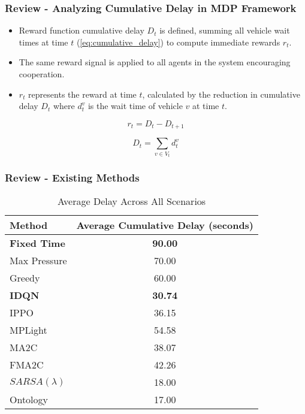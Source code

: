 \documentclass[compress,12pt]{beamer}
\begin{document}
\begin{frame}[bg=arguelles.png]
      \frametitle{Review - Analyzing Cumulative Delay in MDP Framework}
      \begin{itemize}
        \item Reward function cumulative delay $D_t$ is defined, summing all vehicle wait times at time $t$ (\ref{eq:cumulative_delay}) to compute immediate rewards $r_t$.
        \item The same reward signal is applied to all agents in the system encouraging cooperation.
        \item $r_t$ represents the reward at time $t$, calculated by the reduction in cumulative delay $D_t$ where $d_t^v$ is the wait time of vehicle $v$ at time $t$.
      \end{itemize}

    \begin{equation}
    r_t = D_t - D_{t+1}
    \label{eq:cumulative_delay}
    \end{equation}

    \begin{equation}
    D_t = \sum_{v \in V_t} d_t^v
    \label{eq:wait_time_sum}
    \end{equation}
\end{frame}


\begin{frame}[bg=arguelles.png]
      \frametitle{Review - Existing Methods}

    \begin{table}[H]
    \centering
    \small
    \begin{tabular}{lc}
    \hline
    \textbf{Method} & \textbf{Average Cumulative Delay (seconds)} \\ \hline
    \textbf{Fixed Time}      & \textbf{90.00}\footnotemark[2]  \\
    Max Pressure    & 70.00\footnotemark[2]  \\
    Greedy          & 60.00\footnotemark[2]  \\
    \textbf{IDQN}            & \textbf{30.74}                  \\
    IPPO            & 36.15                  \\
    MPLight         & 54.58                  \\
    MA2C            & 38.07\footnotemark[1]                  \\
    FMA2C           & 42.26                  \\
    \(SARSA(\lambda)\)           & 18.00\footnotemark[2]                  \\
    Ontology        & 17.00\footnotemark[2]                  \\ \hline
    \end{tabular}
    \caption{Average Delay Across All Scenarios}
    \label{tab:avg_delay}
    \end{table}
\end{frame}
\end{document}
